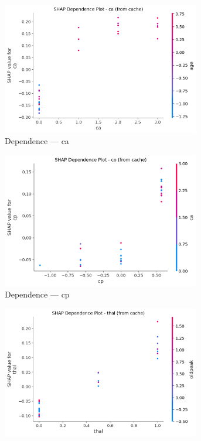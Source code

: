 \begin{figure}[H]
\centering
\begin{subfigure}[b]{0.31\textwidth}
\centering
\includegraphics[width=0.95\textwidth]{Result/cleveland_dataset/Catboost/SHAP/Dependence CA.png}
\caption{Dependence — ca}
\label{fig:cat_clev_dep_ca}
\end{subfigure}\hfill
\begin{subfigure}[b]{0.31\textwidth}
\centering
\includegraphics[width=0.95\textwidth]{Result/cleveland_dataset/Catboost/SHAP/Dependence CP.png}
\caption{Dependence — cp}
\label{fig:cat_clev_dep_cp}
\end{subfigure}\hfill
\begin{subfigure}[b]{0.31\textwidth}
\centering
\includegraphics[width=0.95\textwidth]{Result/cleveland_dataset/Catboost/SHAP/Dependence thal.png}

\end{subfigure}
\end{figure}
